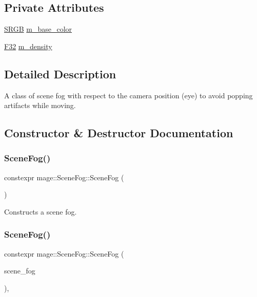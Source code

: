\subsection*{Private Attributes}
\begin{DoxyCompactItemize}
\item 
\hyperlink{structmage_1_1_s_r_g_b}{S\+R\+GB} \hyperlink{classmage_1_1_scene_fog_aa5440867e5dc3dda9532899e98ff44ae}{m\+\_\+base\+\_\+color}
\item 
\hyperlink{namespacemage_aa97e833b45f06d60a0a9c4fc22ae02c0}{F32} \hyperlink{classmage_1_1_scene_fog_a16d4e67f373716f100ed6809c387b74c}{m\+\_\+density}
\end{DoxyCompactItemize}


\subsection{Detailed Description}
A class of scene fog with respect to the camera position (eye) to avoid popping artifacts while moving. 

\subsection{Constructor \& Destructor Documentation}
\hypertarget{classmage_1_1_scene_fog_a7761b9d8f1c16a175828bf11882717ea}{}\label{classmage_1_1_scene_fog_a7761b9d8f1c16a175828bf11882717ea} 
\subsubsection{\texorpdfstring{Scene\+Fog()}{SceneFog()}\hspace{0.1cm}{\footnotesize\ttfamily [1/3]}}
{\footnotesize\ttfamily constexpr mage\+::\+Scene\+Fog\+::\+Scene\+Fog (\begin{DoxyParamCaption}{ }\end{DoxyParamCaption})\hspace{0.3cm}{\ttfamily [noexcept]}}

Constructs a scene fog. \hypertarget{classmage_1_1_scene_fog_a0b13e24eaa1d54e03b82475a5d0823a8}{}\label{classmage_1_1_scene_fog_a0b13e24eaa1d54e03b82475a5d0823a8} 
\subsubsection{\texorpdfstring{Scene\+Fog()}{SceneFog()}\hspace{0.1cm}{\footnotesize\ttfamily [2/3]}}
{\footnotesize\ttfamily constexpr mage\+::\+Scene\+Fog\+::\+Scene\+Fog (\begin{DoxyParamCaption}\item[{const \hyperlink{classmage_1_1_scene_fog}{Scene\+Fog} \&}]{scene\+\_\+fog }\end{DoxyParamCaption})\hspace{0.3cm}{\ttfamily [default]}, {\ttfamily [noexcept]}}

